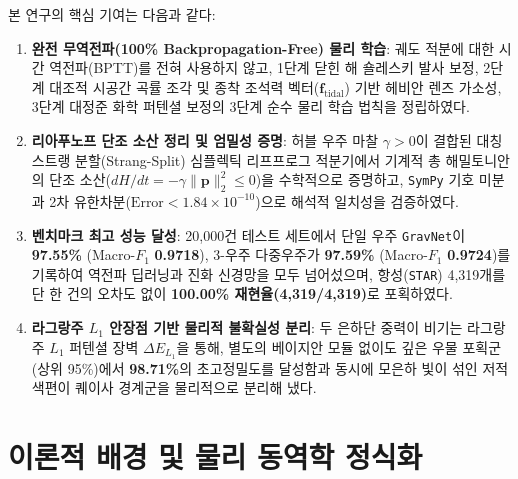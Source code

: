 \documentclass[journal]{IEEEtran}
\begin{document}
본 연구의 핵심 기여는 다음과 같다:
\begin{enumerate}
  \item \textbf{완전 무역전파(100\% Backpropagation-Free) 물리 학습}: 궤도 적분에 대한 시간 역전파(BPTT)를 전혀 사용하지 않고, 1단계 닫힌 해 숄레스키 발사 보정, 2단계 대조적 시공간 곡률 조각 및 종착 조석력 벡터($\mathbf{f}_{\text{tidal}}$) 기반 헤비안 렌즈 가소성, 3단계 대정준 화학 퍼텐셜 보정의 3단계 순수 물리 학습 법칙을 정립하였다.
  \item \textbf{리아푸노프 단조 소산 정리 및 엄밀성 증명}: 허블 우주 마찰 $\gamma > 0$이 결합된 대칭 스트랭 분할(Strang-Split) 심플렉틱 리프프로그 적분기에서 기계적 총 해밀토니안의 단조 소산($dH/dt = -\gamma \|\mathbf{p}\|_2^2 \le 0$)을 수학적으로 증명하고, \texttt{SymPy} 기호 미분과 2차 유한차분($\text{Error} < 1.84 \times 10^{-10}$)으로 해석적 일치성을 검증하였다.
  \item \textbf{벤치마크 최고 성능 달성}: 20,000건 테스트 세트에서 단일 우주 \texttt{GravNet}이 \textbf{97.55\%} (Macro-$F_1$ \textbf{0.9718}), 3-우주 다중우주가 \textbf{97.59\%} (Macro-$F_1$ \textbf{0.9724})를 기록하여 역전파 딥러닝과 진화 신경망을 모두 넘어섰으며, 항성(\texttt{STAR}) 4,319개를 단 한 건의 오차도 없이 \textbf{100.00\% 재현율(4,319/4,319)}로 포획하였다.
  \item \textbf{라그랑주 $L_1$ 안장점 기반 물리적 불확실성 분리}: 두 은하단 중력이 비기는 라그랑주 $L_1$ 퍼텐셜 장벽 $\Delta E_{L_1}$을 통해, 별도의 베이지안 모듈 없이도 깊은 우물 포획군(상위 95\%)에서 \textbf{98.71\%}의 초고정밀도를 달성함과 동시에 모은하 빛이 섞인 저적색편이 퀘이사 경계군을 물리적으로 분리해 냈다.
\end{enumerate}

\section{이론적 배경 및 물리 동역학 정식화}
\end{document}
